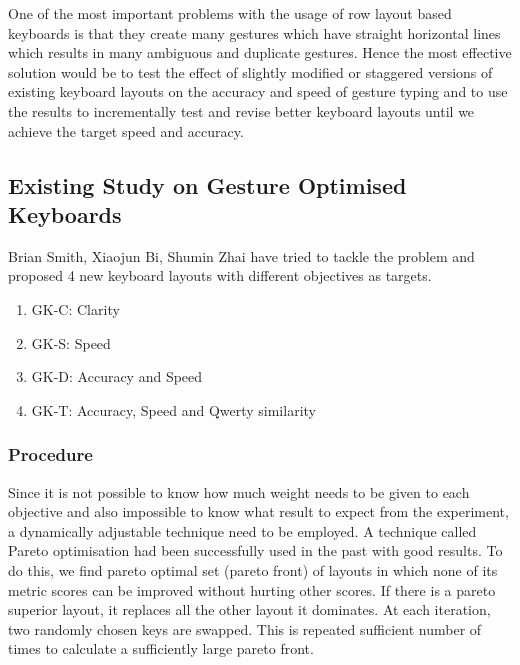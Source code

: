 \documentclass[12pt]{article}
\begin{document}
One of the most important problems with the usage of row layout based keyboards is that they create many gestures which have straight horizontal lines which results in many ambiguous and duplicate gestures. Hence the most effective solution would be to test the effect of slightly modified or staggered versions of existing keyboard layouts on the accuracy and speed of gesture typing and to use the results to incrementally test and revise better keyboard layouts until we achieve the target speed and accuracy.


\subsection{Existing Study on Gesture Optimised Keyboards}
Brian Smith, Xiaojun Bi, Shumin Zhai \cite{gesturerecog} have tried to tackle the problem and proposed 4 new keyboard layouts with different objectives as targets.

\begin{enumerate}

    \item GK-C: Clarity
    \item GK-S: Speed
    \item GK-D: Accuracy and Speed
    \item GK-T: Accuracy, Speed and Qwerty similarity
\end{enumerate}


\subsubsection{Procedure}
Since it is not possible to know how much weight needs to be given to each objective and also impossible to know what result to expect from the experiment, a dynamically adjustable technique need to be employed. A technique called Pareto optimisation had been successfully used in the past with good results. To do this, we find pareto optimal set (pareto front) of layouts in which none of its metric scores can be improved without hurting other scores. If there is a pareto superior layout, it replaces all the other layout it dominates. At each iteration, two randomly chosen keys are swapped. This is repeated sufficient number of times to calculate a sufficiently large pareto front. 
\end{document}

